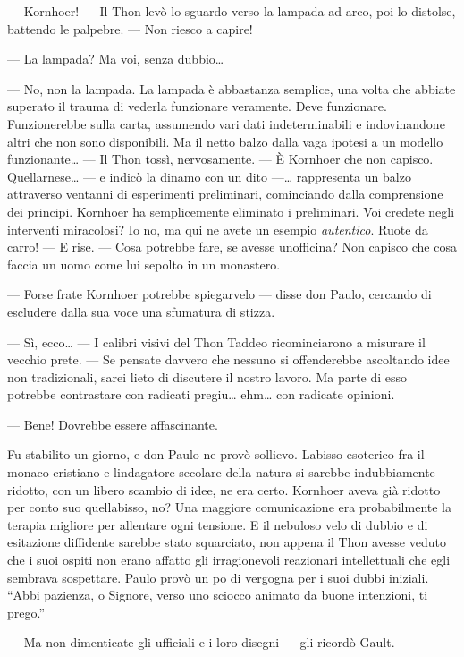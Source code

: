 --- Kornhoer! --- Il Thon levò lo sguardo verso la lampada ad arco, poi
lo distolse, battendo le palpebre. --- Non riesco a capire!

--- La lampada? Ma voi, senza dubbio\ldots{}

--- No, non la lampada. La lampada è abbastanza semplice, una volta che
abbiate superato il trauma di vederla funzionare veramente. Deve
funzionare. Funzionerebbe sulla carta, assumendo vari dati
indeterminabili e indovinandone altri che non sono disponibili. Ma il
netto balzo dalla vaga ipotesi a un modello funzionante\ldots{} --- Il
Thon tossì, nervosamente. --- È Kornhoer che non capisco.
Quell\textquotesingle arnese\ldots{} --- e indicò la dinamo con un dito
---\ldots{} rappresenta un balzo attraverso vent\textquotesingle anni di
esperimenti preliminari, cominciando dalla comprensione dei principi.
Kornhoer ha semplicemente eliminato i preliminari. Voi credete negli
interventi miracolosi? Io no, ma qui ne avete un esempio
\emph{autentico}. Ruote da carro! --- E rise. --- Cosa potrebbe fare, se
avesse un\textquotesingle officina? Non capisco che cosa faccia un uomo
come lui sepolto in un monastero.

--- Forse frate Kornhoer potrebbe spiegarvelo --- disse don Paulo,
cercando di escludere dalla sua voce una sfumatura di stizza.

--- Sì, ecco\ldots{} --- I calibri visivi del Thon Taddeo ricominciarono
a misurare il vecchio prete. --- Se pensate davvero che nessuno si
offenderebbe ascoltando idee non tradizionali, sarei lieto di discutere
il nostro lavoro. Ma parte di esso potrebbe contrastare con radicati
pregiu\ldots{} ehm\ldots{} con radicate opinioni.

--- Bene! Dovrebbe essere affascinante.

Fu stabilito un giorno, e don Paulo ne provò sollievo.
L\textquotesingle abisso esoterico fra il monaco cristiano e
l\textquotesingle indagatore secolare della natura si sarebbe
indubbiamente ridotto, con un libero scambio di idee, ne era certo.
Kornhoer aveva già ridotto per conto suo quell\textquotesingle abisso,
no? Una maggiore comunicazione era probabilmente la terapia migliore per
allentare ogni tensione. E il nebuloso velo di dubbio e di esitazione
diffidente sarebbe stato squarciato, non appena il Thon avesse veduto
che i suoi ospiti non erano affatto gli irragionevoli reazionari
intellettuali che egli sembrava sospettare. Paulo provò un
po\textquotesingle{} di vergogna per i suoi dubbi iniziali. ``Abbi
pazienza, o Signore, verso uno sciocco animato da buone intenzioni, ti
prego.''

--- Ma non dimenticate gli ufficiali e i loro disegni --- gli ricordò
Gault.
